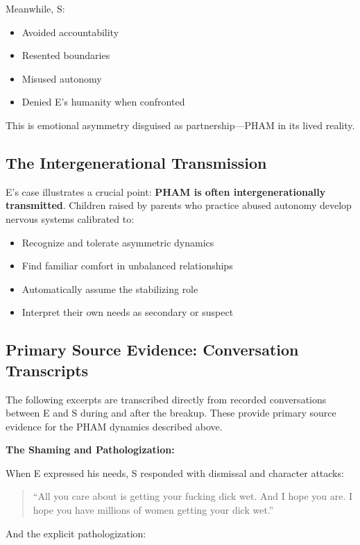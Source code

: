 \documentclass[12pt,openany]{book}
\numberwithin{equation}{chapter}
\begin{document}
Meanwhile, S:
\begin{itemize}
    \item Avoided accountability
    \item Resented boundaries
    \item Misused autonomy
    \item Denied E's humanity when confronted
\end{itemize}

This is emotional asymmetry disguised as partnership---PHAM in its lived reality.

\subsection{The Intergenerational Transmission}

E's case illustrates a crucial point: \textbf{PHAM is often intergenerationally transmitted}. Children raised by parents who practice abused autonomy develop nervous systems calibrated to:

\begin{itemize}
    \item Recognize and tolerate asymmetric dynamics
    \item Find familiar comfort in unbalanced relationships
    \item Automatically assume the stabilizing role
    \item Interpret their own needs as secondary or suspect
\end{itemize}

\subsection{Primary Source Evidence: Conversation Transcripts}

The following excerpts are transcribed directly from recorded conversations between E and S during and after the breakup. These provide primary source evidence for the PHAM dynamics described above.

\textbf{The Shaming and Pathologization:}

When E expressed his needs, S responded with dismissal and character attacks:

\begin{quote}
``All you care about is getting your fucking dick wet. And I hope you are. I hope you have millions of women getting your dick wet.''
\end{quote}

And the explicit pathologization:
\end{document}
